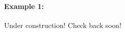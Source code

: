 \documentclass[../revisedmain.tex]{subfiles}
\begin{document}
	\paragraph{Example 1:} Under construction! Check back soon!\\
\end{document}
